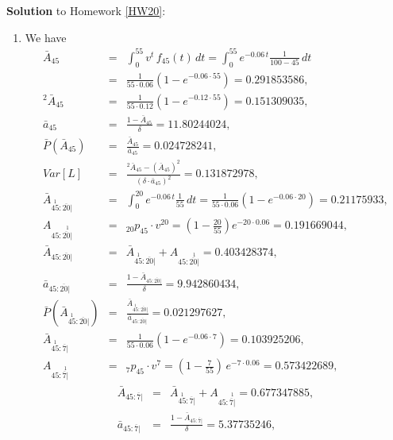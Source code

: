 \documentclass[11pt,fleqn,oneside]{book}
\begin{document}
\noindent \textbf{Solution} to Homework \ref{HW20}:
\footnotesize
\begin{enumerate}
\item We have
\begin{eqnarray*}
\bar{A}_{45} &=& \int_0^{55} v^t\,f_{45}(t)\,dt = \int_0^{55} e^{-0.06\,t} \frac{1}{100-45}\,dt\\
&=& \frac{1}{55\cdot 0.06}\left(1 - e^{-0.06\cdot 55}\right) = 0.291853586,\\
{^2\bar{A}_{45}} &=& \frac{1}{55\cdot 0.12}\left(1 - e^{-0.12\cdot 55}\right) = 0.151309035,\\
{\bar{a}_{45}} &=& \frac{1 - \bar{A}_{45}}{\delta} = 11.80244024,\\
\bar{P}\left(\bar{A}_{45}\right) &=& \frac{\bar{A}_{45}}{\bar{a}_{45}} = 0.024728241,\\
Var[L] &=& \frac{{^2\bar{A}_{45}} - \left(\bar{A}_{45}\right)^2}{\left(\delta \cdot \bar{a}_{45}\right)^2} = 0.131872978,\\
\bar{A}_{\stackrel{1}{45}:\overline{20}|} &=& \int_0^{20} e^{-0.06\, t}\frac{1}{55}\,dt = \frac{1}{55\cdot 0.06}
\left(1-e^{-0.06\cdot 20}\right) = 0.21175933,\\
A_{45:\stackrel{1}{\overline{20}|}} &=& {_{20}p_{45}}\cdot v^{20} = \left(1 - \frac{20}{55}\right) e^{-20\cdot 0.06} = 0.191669044,\\
\bar{A}_{45:\overline{20}|} &=& \bar{A}_{\stackrel{1}{45}:\overline{20}|} + A_{45:\stackrel{1}{\overline{20}|}} = 0.403428374,\\
\bar{a}_{45:\overline{20}|} &=& \frac{1 - \bar{A}_{45:\overline{20}|} }{\delta} = 9.942860434,\\
\bar{P}\left(\bar{A}_{\stackrel{1}{45}:\overline{20}|}\right) &=& \frac{\bar{A}_{\stackrel{1}{45}:\overline{20}|} }{\bar{a}_{45:\overline{20}|} } = 0.021297627,\\
\bar{A}_{\stackrel{1}{45}:\overline{7}|} &=& \frac{1}{55\cdot 0.06} \left(1-e^{-0.06\cdot 7}\right) = 0.103925206,\\
A_{45:\stackrel{1}{\overline{7}|}} &=& {_7p_{45}}\cdot v^7 = \left(1 - \frac{7}{55}\right)\,e^{-7\cdot 0.06} = 0.573422689,
\end{eqnarray*}
\begin{eqnarray*}
\bar{A}_{45:\overline{7}|} &=& \bar{A}_{\stackrel{1}{45}:\overline{7}|} + A_{45:\stackrel{1}{\overline{7}|}} = 0.677347885,\\
\bar{a}_{45:\overline{7}|} &=& \frac{1 - \bar{A}_{45:\overline{7}|} }{\delta} = 5.37735246,\\

\end{eqnarray*}
\end{enumerate}
\end{document}
